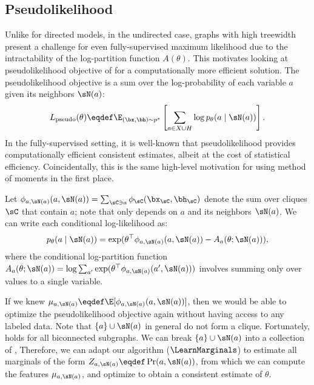 \subsection{Pseudolikelihood}
\label{sec:pseudolikelihood}

Unlike for directed models, in the undirected case,
graphs with high treewidth present a challenge
for even fully-supervised maximum likelihood due to the intractability of the log-partition function $A(\theta)$.
This motivates looking at pseudolikelihood objective of \citep{besag75pseudo} for a computationally more
efficient solution.
The pseudolikelihood objective is a sum over the log-probability of each variable $a$ given its neighbors $\sN(a)$:
\begin{align}
  \label{eqn:pseudolikelihood}
L_\text{pseudo}(\theta) \eqdef \E_{(\bx,\bh) \sim p^*}\left[\sum_{a \in X \cup H} \log p_\theta(a \mid \sN(a))\right].
\end{align}
In the fully-supervised setting, it is well-known that pseudolikelihood provides computationally efficient consistent estimates,
albeit at the cost of statistical efficiency.
Coincidentally, this is the same high-level motivation for using method of moments in the first place.

Let $\phi_{a,\sN(a)}(a, \sN(a)) = \sum_{\sC \ni a} \phi_\sC(\bx_\sC,\bh_\sC)$
denote the sum over cliques $\sC$ that contain $a$; note that only depends on $a$ and its neighbors $\sN(a)$.
We can write each conditional log-likelihood as:
\begin{align}
p_\theta(a \mid \sN(a)) = \exp(\theta^\top\phi_{a,\sN(a)}(a, \sN(a)) - A_a(\theta; \sN(a))),
\end{align}
where the conditional log-partition function $A_a(\theta; \sN(a)) = \log \sum_{a'} \exp(\theta^\top\phi_{a,\sN(a)}(a', \sN(a)))$
involves summing only over values to a single variable.

If we knew $\mu_{a,\sN(a)} \eqdef \E[\phi_{a,\sN(a)}(a,\sN(a))]$,
then we would be able to optimize the pseudolikelihood objective again without
having access to any labeled data.
Note that $\{a\}\cup\sN(a)$ in general do not form a clique.
Fortunately,  holds for all biconnected subgraphs.
We can break $\{a\}\cup\sN(a)$ into a collection of 
  ,
  Therefore, we can adapt our algorithm ($\LearnMarginals$) to estimate all marginals of the form $Z_{a,\sN(a)} \eqdef \Pr(a,\sN(a))$,
  from which we can compute the features $\mu_{a,\sN(a)}$,
  and optimize  to obtain a consistent estimate of $\theta$.

